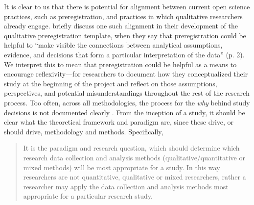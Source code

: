 \documentclass[authordate, meta]{jote-new-article}
\begin{document}
It is clear to us that there is potential for alignment between current open science practices, such as preregistration, and practices in which qualitative researchers already engage. \textcites{Haven2020} briefly discuss one such alignment in their development of the qualitative preregistration template, when they say that preregistration could be helpful to “make visible the connections between analytical assumptions, evidence, and decisions that form a particular interpretation of the data” (p. 2). We interpret this to mean that preregistration could be helpful as a means to encourage reflexivity—for researchers to document how they conceptualized their study at the beginning of the project and reflect on those assumptions, perspectives, and potential misunderstandings throughout the rest of the research process. Too often, across all methodologies, the process for the \emph{why} behind study decisions is not documented clearly \parencites{Mackenzie2006}. From the inception of a study, it should be clear what the theoretical framework and paradigm are, since these drive, or should drive, methodology and methods. Specifically,



\begin{quote}
  It is the paradigm and research question, which should determine which research data collection and analysis methods (qualitative/quantitative or mixed methods) will be most appropriate for a study. In this way researchers are not quantitative, qualitative or mixed researchers, rather a researcher may apply the data collection and analysis methods most appropriate for a particular research study. \parencites[page 7-8]{Mackenzie2006}
\end{quote}
\end{document}
